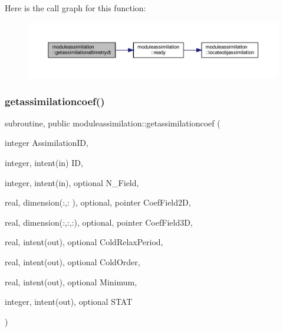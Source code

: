 Here is the call graph for this function\+:\nopagebreak
\begin{figure}[H]
\begin{center}
\leavevmode
\includegraphics[width=350pt]{namespacemoduleassimilation_a4c4fab1da99106327a65575667e03252_cgraph}
\end{center}
\end{figure}
\mbox{\label{namespacemoduleassimilation_aeb67db12f57e948ab0d21c07cf0f3ee4}} 
\subsubsection{\texorpdfstring{getassimilationcoef()}{getassimilationcoef()}}
{\footnotesize\ttfamily subroutine, public moduleassimilation\+::getassimilationcoef (\begin{DoxyParamCaption}\item[{integer}]{Assimilation\+ID,  }\item[{integer, intent(in)}]{ID,  }\item[{integer, intent(in), optional}]{N\+\_\+\+Field,  }\item[{real, dimension(\+:,\+:  ), optional, pointer}]{Coef\+Field2D,  }\item[{real, dimension(\+:,\+:,\+:), optional, pointer}]{Coef\+Field3D,  }\item[{real, intent(out), optional}]{Cold\+Relax\+Period,  }\item[{real, intent(out), optional}]{Cold\+Order,  }\item[{real, intent(out), optional}]{Minimum,  }\item[{integer, intent(out), optional}]{S\+T\+AT }\end{DoxyParamCaption})}

